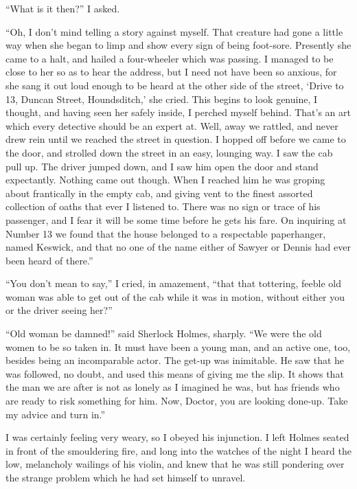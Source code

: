 \documentclass[12pt]{book}
\begin{document}
“What is it then?” I asked. 

“Oh, I don’t mind telling a story against myself. That creature had gone a little way when she began to limp and show every sign of being foot-sore. Presently she came to a halt, and hailed a four-wheeler which was passing. I managed to be close to her so as to hear the address, but I need not have been so anxious, for she sang it out loud enough to be heard at the other side of the street, ‘Drive to 13, Duncan Street, Houndsditch,’ she cried. This begins to look genuine, I thought, and having seen her safely inside, I perched myself behind. That’s an art which every detective should be an expert at. Well, away we rattled, and never drew rein until we reached the street in question. I hopped off before we came to the door, and strolled down the street in an easy, lounging way. I saw the cab pull up. The driver jumped down, and I saw him open the door and stand expectantly. Nothing came out though. When I reached him he was groping about frantically in the empty cab, and giving vent to the finest assorted collection of oaths that ever I listened to. There was no sign or trace of his passenger, and I fear it will be some time before he gets his fare. On inquiring at Number 13 we found that the house belonged to a respectable paperhanger, named Keswick, and that no one of the name either of Sawyer or Dennis had ever been heard of there.” 

“You don’t mean to say,” I cried, in amazement, “that that tottering, feeble old woman was able to get out of the cab while it was in motion, without either you or the driver seeing her?” 

“Old woman be damned!” said Sherlock Holmes, sharply. “We were the old women to be so taken in. It must have been a young man, and an active one, too, besides being an incomparable actor. The get-up was inimitable. He saw that he was followed, no doubt, and used this means of giving me the slip. It shows that the man we are after is not as lonely as I imagined he was, but has friends who are ready to risk something for him. Now, Doctor, you are looking done-up. Take my advice and turn in.” 

I was certainly feeling very weary, so I obeyed his injunction. I left Holmes seated in front of the smouldering fire, and long into the watches of the night I heard the low, melancholy wailings of his violin, and knew that he was still pondering over the strange problem which he had set himself to unravel. 
\end{document}
